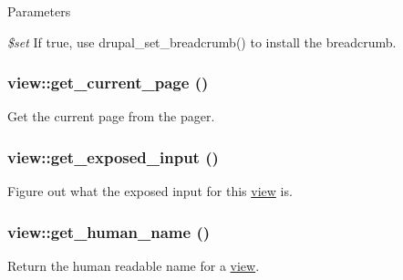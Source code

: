 \begin{DoxyParams}{Parameters}
\item[{\em \$set}]If true, use drupal\_\-set\_\-breadcrumb() to install the breadcrumb. \end{DoxyParams}
\hypertarget{classview_a378b971894ed8b9c0ddaf36c8da52819}{
\subsubsection[{get\_\-current\_\-page}]{\setlength{\rightskip}{0pt plus 5cm}view::get\_\-current\_\-page ()}}
\label{classview_a378b971894ed8b9c0ddaf36c8da52819}
Get the current page from the pager. \hypertarget{classview_ac89e7aa08b258bc09d8e6209c6ebcfc2}{
\subsubsection[{get\_\-exposed\_\-input}]{\setlength{\rightskip}{0pt plus 5cm}view::get\_\-exposed\_\-input ()}}
\label{classview_ac89e7aa08b258bc09d8e6209c6ebcfc2}
Figure out what the exposed input for this \hyperlink{classview}{view} is. \hypertarget{classview_aaa81acca86f138d34887f142910ad0e4}{
\subsubsection[{get\_\-human\_\-name}]{\setlength{\rightskip}{0pt plus 5cm}view::get\_\-human\_\-name ()}}
\label{classview_aaa81acca86f138d34887f142910ad0e4}
Return the human readable name for a \hyperlink{classview}{view}.

